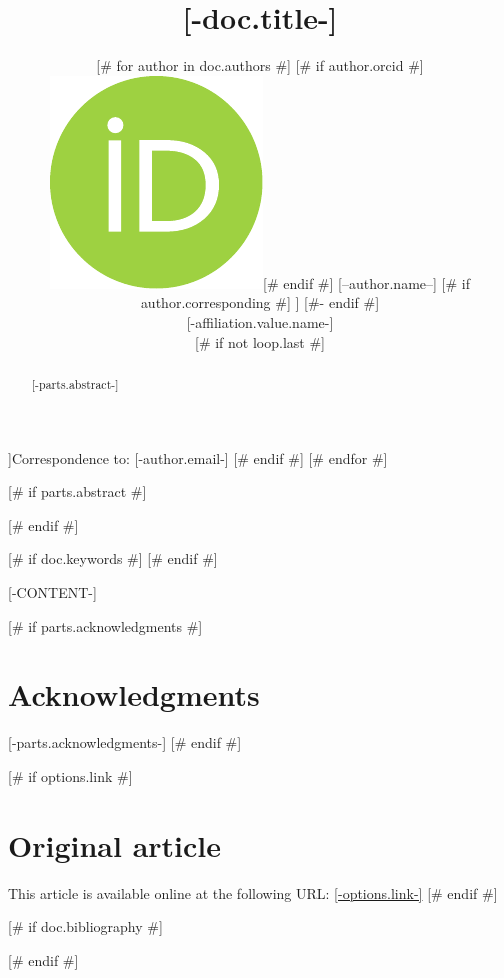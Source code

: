 \documentclass{article}
\title{[-doc.title-]}
\date{\displaydate{articleDate}}
[# else #]
\date{}
[# endif #]
\author{[# for author in doc.authors #]
[# if author.orcid #]\href{https://orcid.org/[-author.orcid-]}{\includegraphics[scale=0.06]{orcid.pdf}}\hspace{1mm}[# endif #]
[--author.name--]
[# if author.corresponding #]
\footnotemark[[-author.corresponding.index-]]
[#- endif #]\\
[# for affiliation in author.affiliations #][-affiliation.value.name-]\\[# endfor #]
[# if not loop.last #]
\AND
[# endif #]
[# endfor #]
}
\begin{document}
\footnotetext[[-author.corresponding.index-]]{Correspondence to: [-author.email-]}
[# endif #]
[# endfor #]

[# if parts.abstract #]
\begin{abstract}
[-parts.abstract-]
\end{abstract}
[# endif #]

[# if doc.keywords #]
[# endif #]

[-CONTENT-]

[# if parts.acknowledgments #]
\section*{Acknowledgments}
[-parts.acknowledgments-]
[# endif #]

[# if options.link #]
\section*{Original article}
\footnotesize
This article is available online at the following URL: \href{[-options.link-]}{[-options.link-]}
\normalsize
[# endif #]

[# if doc.bibliography #]


[# endif #]
\end{document}
